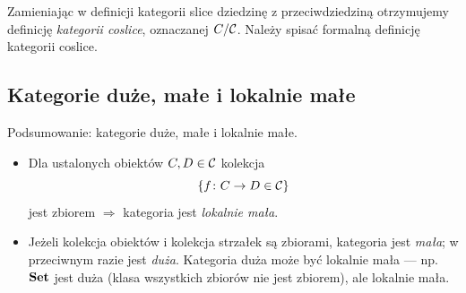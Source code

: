 \begin{uwaga}
Zamieniając w definicji kategorii slice dziedzinę z przeciwdziedziną otrzymujemy definicję \emph{kategorii coslice}, oznaczanej $C / \mathcal{C}$. Należy spisać formalną definicję kategorii coslice.
\end{uwaga}

\subsection{Kategorie duże, małe i lokalnie małe}

\begin{uwaga}
Podsumowanie: kategorie duże, małe i lokalnie małe.
\begin{itemize}
    \item Dla ustalonych obiektów $C, D \in \mathcal{C}$ kolekcja
    \[
        \{f \colon C \to D \in \mathcal{C}\}
    \]
    jest zbiorem $\Longrightarrow$ kategoria jest \emph{lokalnie mała}.
    \item Jeżeli kolekcja obiektów i kolekcja strzałek są zbiorami, kategoria jest \emph{mała}; w przeciwnym razie jest \emph{duża}. Kategoria duża może być lokalnie mała --- np.\ $\mathbf{Set}$ jest duża (klasa wszystkich zbiorów nie jest zbiorem), ale lokalnie mała.
\end{itemize}
\end{uwaga}
